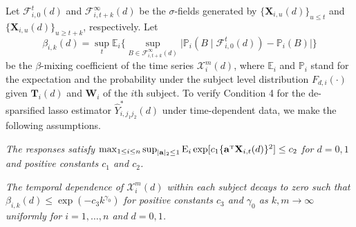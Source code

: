 \documentclass[12pt]{article}
\numberwithin{equation}{section}
\def\T{{ \mathrm{\scriptscriptstyle T} }}
\newcommand{\E}{\rm E}
\newcommand{\bT}{{\mathbf T}}
\newcommand{\bW}{{\mathbf W}}
\newcommand{\bX}{{\mathbf X}}
\newcommand{\ba}{{\mathbf a}}
\begin{document}
Let $\mathscr{F}_{i, 0}^t(d)$ and $\mathscr{F}_{i, t+k}^{\infty}(d)$ be the $\sigma$-fields generated by $\{\bX_{i, u}(d)\}_{u\leq t}$ and $\{\bX_{i, u}(d)\}_{u\geq t+k}$, respectively.
Let
\[
\beta_{i, k}(d) = \sup_t\mathbb{E}_{i}\bigg\{\sup_{B\in\mathscr{F}_{i, t+k}^{\infty}(d)}\big|\mathbb{P}_{i}(B \mid \mathscr{F}_{i, 0}^t(d))-\mathbb{P}_{i}(B)\big|\bigg\}
\]
be the $\beta$-mixing coefficient of the time series $\mathcal{X}_i^m(d)$, where $\mathbb{E}_{i}$ and $\mathbb{P}_{i}$ stand for the expectation and the probability under the subject level distribution $F_{d, i}(\cdot)$ given $\bT_{i}(d)$ and $\bW_i$ of the $i$th subject.
To verify Condition 4 for the de-sparsified lasso estimator $\hat{Y}_{i, j_1 j_2}^{\ast}(d)$ under time-dependent data,
we make the following assumptions.

\medskip

{\it The responses satisfy 
$\max_{1 \leq i \leq n} \sup_{|\ba|_2 \leq 1} {\E}_{i} \exp [ c_1 \{\ba^{\T} \bX_{i, t}(d)\}^2 ] \leq c_2
$ for $d = 0, 1$ and positive constants $c_1$ and $c_2$.
}

\medskip

{\it The temporal dependence of $\mathcal{X}_{i}^m(d)$ within each subject decays to zero such that $\beta_{i, k}(d) \leq \exp(-c_3 k^{\gamma_0})$ for positive constants $c_3$ and $\gamma_0$ as $k, m \rightarrow\infty$ uniformly for $i = 1, \ldots, n$ and $d = 0, 1$.
}

\medskip
\end{document}
